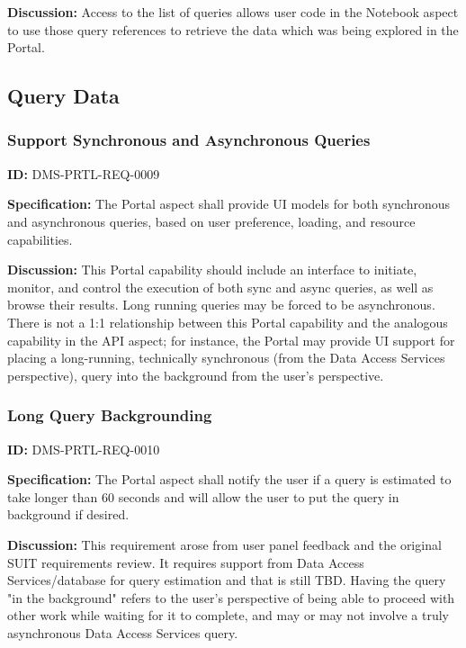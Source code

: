 \documentclass[SE,toc,lsstdraft]{lsstdoc}
\begin{document}
\textbf{Discussion:}
Access to the list of queries allows user code in the Notebook aspect to use those query references to retrieve the data which was being explored in the Portal.

\subsection{Query Data}

\subsubsection{Support Synchronous and Asynchronous Queries}

\label{DMS-PRTL-REQ-0009}
\textbf{ID:} DMS-PRTL-REQ-0009

\textbf{Specification:}
The Portal aspect shall provide UI models for both synchronous and asynchronous queries, based on user preference, loading, and resource capabilities.

\textbf{Discussion:}
This Portal capability should include an interface to initiate, monitor, and control the execution of both sync and async queries, as well as browse their results. Long running queries may be forced to be asynchronous.
There is not a 1:1 relationship between this Portal capability and the analogous capability in the API aspect; for instance, the Portal may provide UI support for placing a long-running, technically synchronous (from the Data Access Services perspective), query into the background from the user's perspective.

\subsubsection{Long Query Backgrounding}

\label{DMS-PRTL-REQ-0010}
\textbf{ID:} DMS-PRTL-REQ-0010

\textbf{Specification:}
The Portal aspect shall notify the user if a query is estimated to take longer than 60 seconds and will allow the user to put the query in background if desired.

\textbf{Discussion:}
This requirement arose from user panel feedback and the original SUIT requirements review.  It requires support from Data Access Services/database for query estimation and that is still TBD.  Having the query "in the background" refers to the user's perspective of being able to proceed with other work while waiting for it to complete, and may or may not involve a truly asynchronous Data Access Services query.
\end{document}
